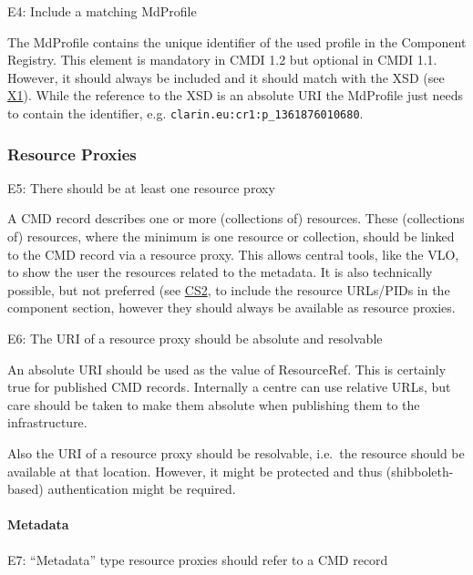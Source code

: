 E4: Include a matching MdProfile


The MdProfile contains the unique identifier of the used profile in the Component Registry. This element is mandatory in CMDI 1.2 but optional in CMDI 1.1. However, it should always be included and it should match with the XSD (see \hyperref[x1]{X1}). While the reference to the XSD is an absolute URI the MdProfile just needs to contain the identifier, e.g.
\texttt{clarin.eu:cr1:p\_1361876010680}.

\subsubsection{Resource Proxies}\label{resource-proxies}

\label{e5}
E5: There should be at least one resource proxy


A CMD record describes one or more (collections of) resources. These (collections of) resources, where the minimum is one resource or collection, should be linked to the CMD record via a resource proxy. This allows central tools, like the VLO, to show the user the resources related to the metadata. It is also technically possible, but not preferred (see \hyperref[cs2]{CS2}, to include the resource URLs/PIDs in the component section, however they should always be available as resource proxies.

E6: The URI of a resource proxy should be absolute and resolvable


An absolute URI should be used as the value of ResourceRef. This is certainly true for published CMD records. Internally a centre can use relative URLs, but care should be taken to make them absolute when publishing them to the infrastructure.

Also the URI of a resource proxy should be resolvable, i.e.~the resource should be available at that location. However, it might be protected and thus (shibboleth-based) authentication might be required.

\paragraph{Metadata}\label{metadata}

E7: ``Metadata'' type resource proxies should refer to a CMD record


